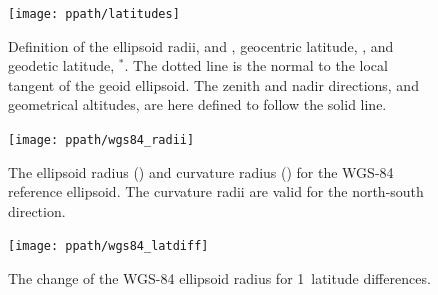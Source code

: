 \begin{figure}[!p]
 \begin{center}
  \begin{minipage}[c]{0.65\textwidth}
   \begin{center}
    \texttt{[image: ppath/latitudes]}
   \end{center}
  \end{minipage}%
  \begin{minipage}[c]{0.35\textwidth}
   \caption{Definition of the ellipsoid radii,  and , 
     geocentric latitude, \Lat, and geodetic latitude, \Lat$^*$. The
     dotted line is the normal to the local tangent of the geoid
     ellipsoid. The zenith and nadir directions, and geometrical
     altitudes, are here defined to follow the solid line.}
   \label{fig:ppath:lats}
  \end{minipage}
 \end{center}
\end{figure}   

\begin{figure}[!p]
 \begin{minipage}[c]{0.65\textwidth}
 \texttt{[image: ppath/wgs84\_radii]}
 \end{minipage}%
 \begin{minipage}[c]{0.35\textwidth}
  \caption{The ellipsoid radius (\aRds{\odot}) and curvature radius ()
    for the
    WGS-84 reference ellipsoid. The curvature radii are valid for the
    north-south direction.}
  \label{fig:ppath:wgs84radii}
 \end{minipage}%
\end{figure}   
        
\begin{figure}[!p]
 \begin{minipage}[c]{0.65\textwidth}
 \texttt{[image: ppath/wgs84\_latdiff]}
 \end{minipage}%
 \begin{minipage}[c]{0.35\textwidth}
  \caption{The change of the WGS-84 ellipsoid radius for  1\degree\ 
            latitude differences.}
  \label{fig:ppath:latdiff}
 \end{minipage}%
\end{figure}   



